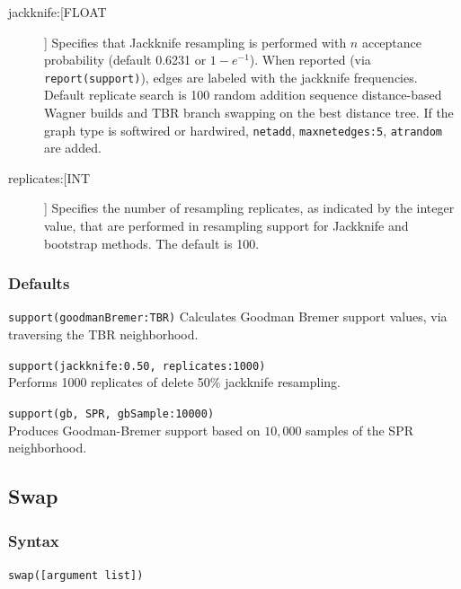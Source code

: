 \begin{description}
		\item[jackknife:[FLOAT]] Specifies that Jackknife resampling is performed with $n$ 
		acceptance probability (default 0.6231 or $1 - e^{-1}$). When reported (via 
		\texttt{report(support)}), edges are labeled with the jackknife frequencies. Default 
		replicate search is 100 random addition sequence distance-based Wagner builds 
		and TBR branch swapping on the best distance tree. If the graph type is softwired 
		or hardwired, \texttt{netadd}, \texttt{maxnetedges:5}, \texttt{atrandom} are added. 
		
		\item[replicates:[INT]] Specifies the number of resampling replicates, as indicated by the 
		integer value, that are performed in resampling support for Jackknife and bootstrap methods. 
		The default is 100.
		
	\end{description}	
		
	\subsubsection{Defaults}
		\texttt{support(goodmanBremer:TBR)} Calculates Goodman Bremer support values, 
		via traversing the TBR neighborhood.
		
		\begin{example}
		
			\item{\texttt{support(jackknife:0.50, replicates:1000)}\\Performs 1000 replicates of 
			delete 50\% jackknife resampling.}
				
			\item{\texttt{support(gb, SPR, gbSample:10000)}\\Produces Goodman-Bremer 
			support based on $10,000$ samples of the SPR neighborhood.}
			
		\end{example}

\subsection{Swap} 
\label{subsec:swap}
	\subsubsection{Syntax}
		\texttt{swap([argument list])}
			
